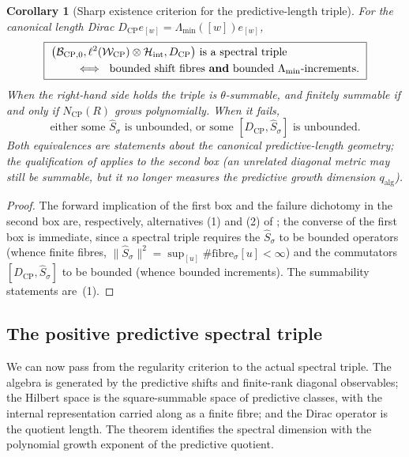 \documentclass[11pt]{article}
\newtheorem{corollary}[theorem]{Corollary}
\theoremstyle{definition}
\theoremstyle{remark}
\newcommand{\B}{\mathcal{B}}
\newcommand{\Hh}{\mathcal{H}}
\newcommand{\W}{\mathcal{W}}
\newcommand{\CP}{\mathrm{CP}}
\newcommand{\qalg}{q_{\mathrm{alg}}}
\newcommand{\Lam}{\Lambda}
\newcommand{\norm}[1]{\lVert#1\rVert}
\begin{document}
\begin{corollary}[Sharp existence criterion for the predictive-length triple]
\label{cor:sharp-existence}
For the canonical length Dirac $D_{\CP}e_{[w]}=\Lam_{\min}([w])e_{[w]}$,
\[
  \boxed{\
  \begin{aligned}
  &\bigl(\B_{\CP,0},\ell^2(\W_{\CP})\otimes\Hh_{\rm int},D_{\CP}\bigr)
   \ \text{is a spectral triple}\\
  &\qquad\iff\ \text{bounded shift fibres}\ \textbf{and}\
   \text{bounded }\Lam_{\min}\text{-increments.}
  \end{aligned}\ }
\]
When the right-hand side holds the triple is $\theta$-summable, and finitely
summable if and only if $N_{\CP}(R)$ grows polynomially.  When it fails,
\[
  \boxed{\
  \text{either some }\widehat S_\sigma\text{ is unbounded, or some }
  [D_{\CP},\widehat S_\sigma]\text{ is unbounded.}
  \ }
\]
Both equivalences are statements about the canonical predictive-length geometry;
the qualification of  applies to the second box (an
unrelated diagonal metric may still be summable, but it no longer measures the
predictive growth dimension $\qalg$).
\end{corollary}

\begin{proof}
The forward implication of the first box and the failure dichotomy in the second
box are, respectively, alternatives (1) and (2) of ;
the converse of the first box is immediate, since a spectral triple requires the
$\widehat S_\sigma$ to be bounded operators (whence finite fibres,
$\norm{\widehat S_\sigma}^2=\sup_{[u]}\#\text{fibre}_\sigma[u]<\infty$) and the
commutators $[D_{\CP},\widehat S_\sigma]$ to be bounded (whence bounded
increments).  The summability statements are \,(1).
\end{proof}






\subsection{The positive predictive spectral triple}
\label{sec:triple}

We can now pass from the regularity criterion to the actual spectral triple.
The algebra is generated by the predictive shifts and finite-rank diagonal
observables; the Hilbert space is the square-summable space of predictive
classes, with the internal representation carried along as a finite fibre; and
the Dirac operator is the quotient length.  The theorem identifies the spectral
dimension with the polynomial growth exponent of the predictive quotient.
\end{document}
